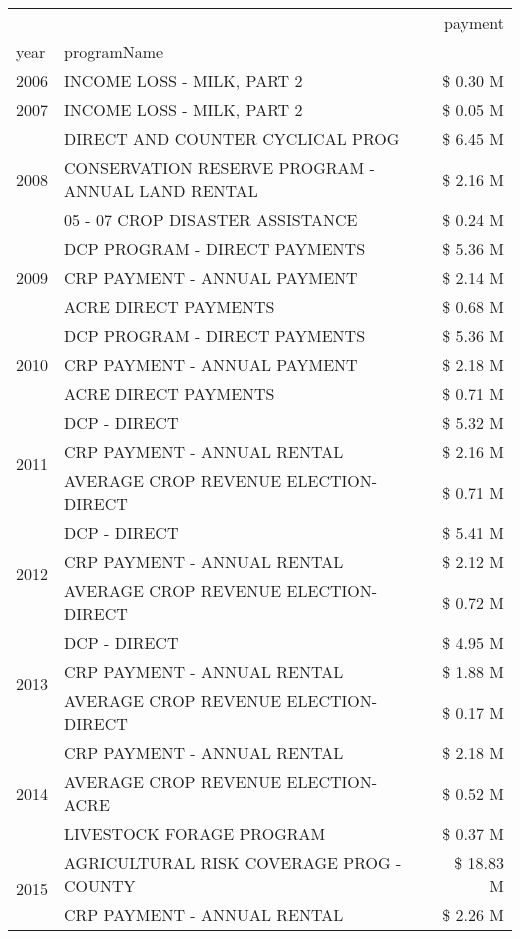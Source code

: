 \begin{tabular}{llr}
\toprule
 &  & payment \\
year & programName &  \\
\midrule
2006 & INCOME LOSS - MILK, PART 2 & \$ 0.30 M \\
\cline{1-3}
2007 & INCOME LOSS - MILK, PART 2 & \$ 0.05 M \\
\cline{1-3}
\multirow[t]{3}{*}{2008} & DIRECT AND COUNTER CYCLICAL PROG & \$ 6.45 M \\
 & CONSERVATION RESERVE PROGRAM - ANNUAL LAND RENTAL & \$ 2.16 M \\
 & 05 - 07 CROP DISASTER ASSISTANCE & \$ 0.24 M \\
\cline{1-3}
\multirow[t]{3}{*}{2009} & DCP PROGRAM - DIRECT PAYMENTS & \$ 5.36 M \\
 & CRP PAYMENT - ANNUAL PAYMENT & \$ 2.14 M \\
 & ACRE DIRECT PAYMENTS & \$ 0.68 M \\
\cline{1-3}
\multirow[t]{3}{*}{2010} & DCP PROGRAM - DIRECT PAYMENTS & \$ 5.36 M \\
 & CRP PAYMENT - ANNUAL PAYMENT & \$ 2.18 M \\
 & ACRE DIRECT PAYMENTS & \$ 0.71 M \\
\cline{1-3}
\multirow[t]{3}{*}{2011} & DCP - DIRECT & \$ 5.32 M \\
 & CRP PAYMENT - ANNUAL RENTAL & \$ 2.16 M \\
 & AVERAGE CROP REVENUE ELECTION-DIRECT & \$ 0.71 M \\
\cline{1-3}
\multirow[t]{3}{*}{2012} & DCP - DIRECT & \$ 5.41 M \\
 & CRP PAYMENT - ANNUAL RENTAL & \$ 2.12 M \\
 & AVERAGE CROP REVENUE ELECTION-DIRECT & \$ 0.72 M \\
\cline{1-3}
\multirow[t]{3}{*}{2013} & DCP - DIRECT & \$ 4.95 M \\
 & CRP PAYMENT - ANNUAL RENTAL & \$ 1.88 M \\
 & AVERAGE CROP REVENUE ELECTION-DIRECT & \$ 0.17 M \\
\cline{1-3}
\multirow[t]{3}{*}{2014} & CRP PAYMENT - ANNUAL RENTAL & \$ 2.18 M \\
 & AVERAGE CROP REVENUE ELECTION-ACRE & \$ 0.52 M \\
 & LIVESTOCK FORAGE PROGRAM & \$ 0.37 M \\
\cline{1-3}
\multirow[t]{3}{*}{2015} & AGRICULTURAL RISK COVERAGE PROG - COUNTY & \$ 18.83 M \\
 & CRP PAYMENT - ANNUAL RENTAL & \$ 2.26 M \\

\end{tabular}
